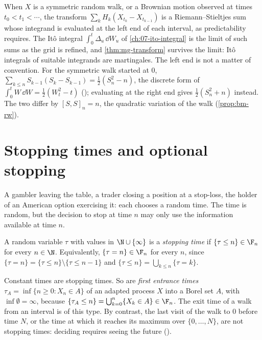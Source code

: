 \begin{remark}\label{rem:mg-ito}
When $X$ is a symmetric random walk, or a Brownian motion observed at times
$t_0<t_1<\cdots$, the transform $\sum_kH_k(X_{t_k}-X_{t_{k-1}})$ is a Riemann--Stieltjes sum
whose integrand is evaluated at the left end of each interval, as predictability requires.
The It\^o integral $\int_0^t\Delta_u\,\dd W_u$ of \cref{ch:07-ito-integral} is the limit of
such sums as the grid is refined, and \cref{thm:mg-transform} survives the limit: It\^o
integrals of suitable integrands are martingales. The left end is not a matter of
convention. For the symmetric walk started at $0$,
$\sum_{k\le n}S_{k-1}(S_k-S_{k-1})=\frac12(S_n^2-n)$, the discrete form of
$\int_0^tW\,\dd W=\frac12(W_t^2-t)$ (); evaluating at the right end gives
$\frac12(S_n^2+n)$ instead. The two differ by $[S,S]_n=n$, the quadratic variation of the
walk (\cref{prop:bm-rw}).
\end{remark}

\section{Stopping times and optional stopping}\label{sec:mg-stopping}

A gambler leaving the table, a trader closing a position at a stop-loss, the holder of an
American option exercising it: each chooses a random time. The time is random, but the
decision to stop at time $n$ may only use the information available at time $n$.

\begin{definition}\label{def:mg-stopping-time}
A random variable $\tau$ with values in $\N\cup\{\infty\}$ is a \emph{stopping time} if
$\{\tau\le n\}\in\F_n$ for every $n\in\N$. Equivalently, $\{\tau=n\}\in\F_n$ for every $n$,
since $\{\tau=n\}=\{\tau\le n\}\setminus\{\tau\le n-1\}$ and
$\{\tau\le n\}=\bigcup_{k\le n}\{\tau=k\}$.
\end{definition}

Constant times are stopping times. So are \emph{first entrance times}
$\tau_A=\inf\{n\ge0:X_n\in A\}$ of an adapted process $X$ into a Borel set $A$, with
$\inf\emptyset=\infty$, because $\{\tau_A\le n\}=\bigcup_{k=0}^{n}\{X_k\in A\}\in\F_n$. The
exit time of a walk from an interval is of this type. By contrast, the last visit of the walk
to $0$ before time $N$, or the time at which it reaches its maximum over $\{0,\dots,N\}$, are
not stopping times: deciding requires seeing the future ().

